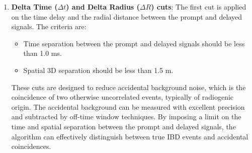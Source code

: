 \begin{enumerate}
	\item \textbf{Delta Time ($\Delta t$) and Delta Radius ($\Delta R$) cuts}: The first cut is applied on the time delay and the radial distance between the prompt and delayed signals. The criteria are:
	\begin{itemize}
		\item Time separation between the prompt and delayed signals should be less than 1.0 ms.
		\item Spatial 3D separation should be less than 1.5 m.
	\end{itemize}

	These cuts are designed to reduce accidental background noise, which is the coincidence of two otherwise uncorrelated events, typically of radiogenic origin. The accidental background can be measured with excellent precision and subtracted by off-time window techniques. By imposing a limit on the time and spatial separation between the prompt and delayed signals, the algorithm can effectively distinguish between true IBD events and accidental coincidences.
	
	\vspace{-1\baselineskip}

	\begin{figure}[h!]
		\centering
		

\end{figure}
\end{enumerate}

